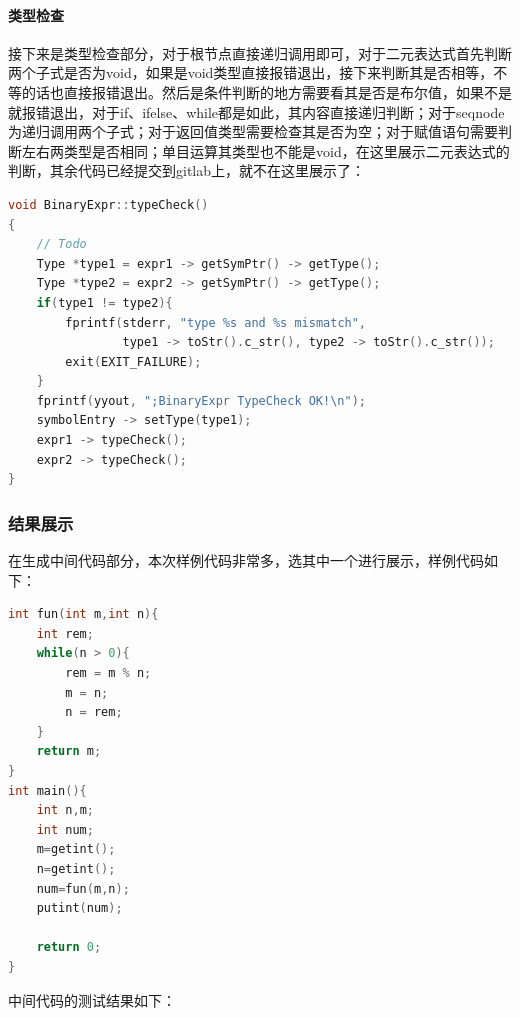 \documentclass[UTF8,a4paper,10pt]{ctexart}
\begin{document}
\paragraph{类型检查}
接下来是类型检查部分，对于根节点直接递归调用即可，对于二元表达式首先判断两个子式是否为void，如果是void类型直接报错退出，接下来判断其是否相等，不等的话也直接报错退出。然后是条件判断的地方需要看其是否是布尔值，如果不是就报错退出，对于if、ifelse、while都是如此，其内容直接递归判断；对于seqnode为递归调用两个子式；对于返回值类型需要检查其是否为空；对于赋值语句需要判断左右两类型是否相同；单目运算其类型也不能是void，在这里展示二元表达式的判断，其余代码已经提交到gitlab上，就不在这里展示了：
\begin{lstlisting}[title = 二元表达式类型检查, language = c++]
void BinaryExpr::typeCheck()
{ 
    // Todo
    Type *type1 = expr1 -> getSymPtr() -> getType();
    Type *type2 = expr2 -> getSymPtr() -> getType();
    if(type1 != type2){
        fprintf(stderr, "type %s and %s mismatch",
                type1 -> toStr().c_str(), type2 -> toStr().c_str());
        exit(EXIT_FAILURE);
    }
    fprintf(yyout, ";BinaryExpr TypeCheck OK!\n");
    symbolEntry -> setType(type1);
    expr1 -> typeCheck();
    expr2 -> typeCheck();
}
\end{lstlisting}

\subsubsection{结果展示}


在生成中间代码部分，本次样例代码非常多，选其中一个进行展示，样例代码如下：

\begin{lstlisting}[title = 中间代码样例代码, language = c++]
int fun(int m,int n){
	int rem;			
	while(n > 0){
		rem = m % n;
		m = n;
		n = rem;
	}
	return m;				
}
int main(){
	int n,m;
	int num;
	m=getint();
	n=getint();
	num=fun(m,n);
	putint(num);

	return 0; 
}
\end{lstlisting}

中间代码的测试结果如下：
\end{document}
